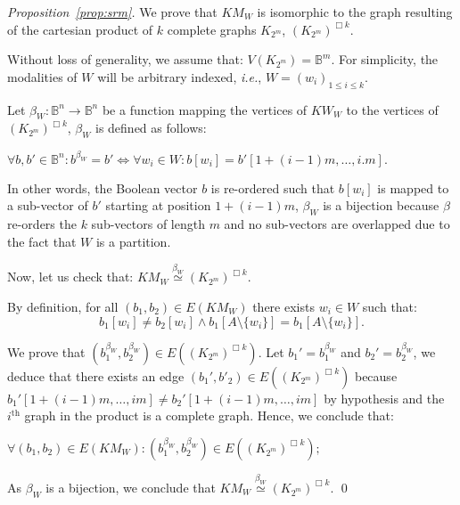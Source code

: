 \documentclass[12pt]{elsarticle}
\newcommand{\Bset}[0]{\mathbb{B}}
\newcommand{\abbrev}[1]{#1, \relax}
\newcommand{\ie}[0]{\abbrev{\textit{i.e.}}}
\begin{document}
\begin{proof}[Proposition~\ref{prop:srm}]
We prove that $KM_W$ is isomorphic to the graph resulting of the cartesian product of $k$ complete graphs $K_{2^m}$, $ (K_{2^m})^{\Box k}$. 

Without loss of generality, we assume that: $V(K_{2^m})=\Bset^m$. For simplicity, the modalities of $W$ will be arbitrary indexed, \ie $W=(w_i)_{1 \leq i \leq k}$. 

\medskip
\noindent
Let $\beta_W: \Bset^n \to \Bset^n$ be a function mapping the vertices of $KW_W$ to the vertices of $(K_{2^m})^{\Box k}$, $\beta_W$ is defined as follows:

$\forall b,b' \in \Bset^n: b^{\beta_W}=b' \iff \forall w_i \in W: 
b[w_i]=b'[1+(i-1)m,\ldots,i.m].$

\medskip
\noindent
 In other words, the Boolean vector $b$ is re-ordered such that $b[w_i]$ is mapped to a sub-vector of $b'$ starting at position $1+(i-1)m$, 
\medskip
\noindent
$\beta_W$ is a bijection because $\beta$ re-orders the $k$ sub-vectors of length $m$ and no sub-vectors are overlapped due to the fact that $W$ is a partition.

\medskip
\noindent
Now, let us check that: $KM_W \stackrel{{\beta_W}}{\simeq} (K_{2^m})^{\Box k}$. 

\noindent
 By definition, for all $(b_1,b_2) \in E(KM_W)$ there exists $w_i \in W$ such that: 
$$b_1[w_i] \neq b_2[w_i] \wedge b_1[A \setminus \{w_i\}]= b_1[A \setminus \{w_i\}].$$ 

\noindent
We prove that  $(b_1^{\beta_W}, b_2^{\beta_W}) \in E( (K_{2^m})^{\Box k})$. 
 Let $b_1'=b_1^{\beta_W}$ and $b_2' = b_2^{\beta_W}$,  we deduce that there exists an edge 
$(b_1',b'_2) \in E( (K_{2^m})^{\Box k})$ because $b_1'[1+(i-1)m,\ldots,im] \neq b_2'[1+(i-1)m,\ldots,im]$ by hypothesis and the $i^\text{th}$ graph in the product is a complete graph. Hence, we conclude that: 

\noindent
$ \forall (b_1,b_2) \in E(KM_W): (b_1^{\beta_W}, b_2^{\beta_W}) \in E( (K_{2^m})^{\Box k});$

\medskip
\noindent
As $\beta_W$ is a bijection, we conclude that $KM_W \stackrel{\beta_W}{\simeq} (K_{2^m})^{\Box k}$.
\qed \end{proof}
\end{document}
